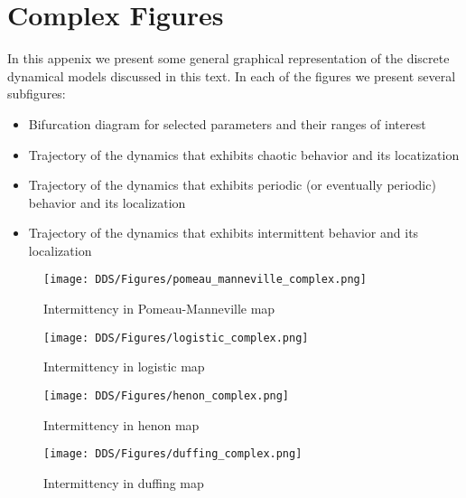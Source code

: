 \chapter{Complex Figures}
\label{sec:Appendix_complex_figures}
In this appenix we present some general graphical representation of the discrete dynamical models discussed in this text.
In each of the figures we present several subfigures:
\begin{itemize}
  \item Bifurcation diagram for selected parameters and their ranges of interest
  \item Trajectory of the dynamics that exhibits chaotic behavior and its locatization
  \item Trajectory of the dynamics that exhibits periodic (or eventually periodic) behavior and its localization
  \item Trajectory of the dynamics that exhibits intermittent behavior and its localization
\end{itemize}

\begin{figure}[!ht]
	\centering
	\texttt{[image: DDS/Figures/pomeau\_manneville\_complex.png]}
	\caption{Intermittency in Pomeau-Manneville map}
	\label{fig:complex_pomeau_manneville}
\end{figure}

\begin{figure}[!ht]
	\centering
	\texttt{[image: DDS/Figures/logistic\_complex.png]}
	\caption{Intermittency in logistic map}
	\label{fig:complex_logistic}
\end{figure}

\begin{figure}[!ht]
	\centering
	\texttt{[image: DDS/Figures/henon\_complex.png]}
	\caption{Intermittency in henon map}
	\label{fig:complex_henon}
\end{figure}

\begin{figure}[!ht]
	\centering
	\texttt{[image: DDS/Figures/duffing\_complex.png]}
	\caption{Intermittency in duffing map}
	\label{fig:complex_duffing}
\end{figure}

\endinput